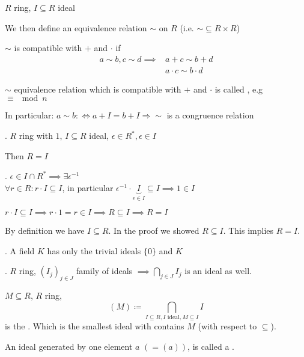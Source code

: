 \begin{definition}
  $R$ ring, $I \subseteq R$ ideal

  We then define an equivalence relation $\sim$ on $R$ (i.e. $\sim \subseteq R \times R$)

  $\sim$ is compatible with $+$ and $\cdot$ if
  \begin{align*}
    a \sim b, c \sim d \implies & a +c \sim b+d \\
                                & a \cdot c \sim b \cdot d
  \end{align*}

  $\sim$ equivalence relation which is compatible with $+$ and $\cdot$
  is called , e.g $\equiv \mod n$

  In particular: $a\sim b :\Leftrightarrow a + I = b + I \Rightarrow \sim$ is a congruence relation
\end{definition}

\Theorem.
$R$ ring with $1$, $I \subseteq R$ ideal, $ \epsilon \in R^{*}, \epsilon \in I$

Then $R = I$

\Proof.
$\epsilon \in I \cap R^{*} \implies \exists \epsilon^{-1}$ \\
$\forall r \in R: r \cdot I \subseteq I$, in particular $\epsilon^{-1} \cdot \underbrace{I}_{\epsilon \in I} \subseteq I \implies 1 \in I$

$r \cdot I \subseteq I \implies r \cdot 1 = r \in I \implies R \subseteq I \implies R = I$

By definition we have $I \subseteq R$. In the proof we showed $R \subseteq I$. This implies $R = I$.

\Corollary.
A field $K$ has only the trivial ideals $\{0\}$ and $K$

\Remark.
$R$ ring, $(I_j)_{j\in J}$ family of ideals $\implies \bigcap_{j \in J} I_j$ is an ideal as well.

\begin{definition}
  $M \subseteq R$, $R$ ring,
  \[
    (M)\coloneqq \bigcap_{I \subseteq R, I \text{ ideal}, M \subseteq I} I
  \]
  is the . Which is the smallest ideal with contains $M$ (with respect to $\subseteq$).
\end{definition}

\begin{definition}
  An ideal generated by one element $a$ $\left( =(a) \right)$, is called a .
\end{definition}

